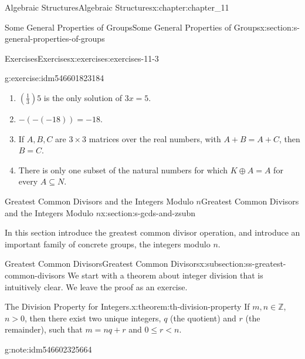 \documentclass[oneside,10pt,]{book}
\numberwithin{equation}{section}
\begin{document}
\begin{chapterptx}{Algebraic Structures}{}{Algebraic Structures}{}{}{x:chapter:chapter_11}
\begin{sectionptx}{Some General Properties of Groups}{}{Some General Properties of Groups}{}{}{x:section:s-general-properties-of-groups}
\begin{exercises-subsection}{Exercises}{}{Exercises}{}{}{x:exercises:exercises-11-3}
\begin{divisionexercise}{6}{}{}{g:exercise:idm546601823184}
\begin{enumerate}[label=(\alph*)]
\item{}\(\left(\frac{1}{3}\right)5\) is the only solution of \(3x = 5\).%
\item{}\(-(-(-18)) = -18\).%
\item{}If \(A, B, C\) are \(3\times 3\) matrices over the real numbers, with \(A + B = A + C\), then \(B = C\).%
\item{}There is only one subset of the natural numbers for which \(K \oplus  A = A\) for every \(A \subseteq N\).%
\end{enumerate}
%
\end{divisionexercise}%
\end{exercises-subsection}
\end{sectionptx}
%
%
\typeout{************************************************}
\typeout{************************************************}
%
\begin{sectionptx}{Greatest Common Divisors  and the Integers Modulo \(n\)}{}{Greatest Common Divisors  and the Integers Modulo \(n\)}{}{}{x:section:s-gcds-and-zsubn}
\begin{introduction}{}%
In this section introduce the greatest common divisor operation, and  introduce an important family of concrete groups, the integers modulo \(n\).%
\end{introduction}%
%
%
\typeout{************************************************}
\typeout{************************************************}
%
\begin{subsectionptx}{Greatest Common Divisors}{}{Greatest Common Divisors}{}{}{x:subsection:ss-greatest-common-divisors}
We start with a theorem about integer division that is intuitively clear.  We leave the proof as an  exercise.%
\begin{theorem}{The Division Property for Integers.}{}{x:theorem:th-division-property}%
%
If \(m, n\in \mathbb{Z}\), \(n>0\), then there exist two unique integers, \(q\) (the quotient) and \(r\) (the remainder), such that \(m = n q + r\) and \(0 \leq  r < n\).%
\end{theorem}
\begin{note}{}{g:note:idm546602325664}%

\end{note}
\end{subsectionptx}
\end{sectionptx}
\end{chapterptx}
\end{document}

